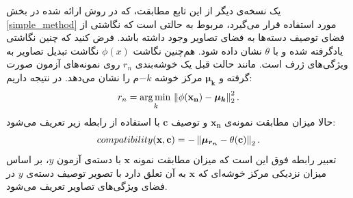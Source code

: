  یک نسخه‌ی دیگر از این تابع مطابقت، که در روش ارائه شده در بخش \ref{simple_method} مورد استفاده قرار می‌گیرد، مربوط به حالتی است که نگاشتی از فضای توصیف دسته‌ها به فضای تصاویر وجود داشته باشد. فرض کنید که چنین نگاشتی یادگرفته شده و با $\theta$ نشان داده شود. هم‌چنین نگاشت
 $\phi(x)$
  نگاشت تبدیل تصاویر به ویژگی‌های ژرف است. مانند حالت قبل یک خوشه‌بندی $r_n$ روی نمونه‌های آزمون صورت گرفته و
   $\boldsymbol{\mu_k} $
    مرکز خوشه $-k$م را نشان می‌دهد. در نتیجه داریم:
 \begin{equation}
 r_n = \operatorname*{arg\,min\,}_{k} \left \lVert \phi(\mathbf{x_n}) - \boldsymbol{\mu_k} \right \rVert_2^2.
 \end{equation}
 حالا میزان مطابقت نمونه‌ی $\mathbf{x_n} $ و توصیف $\mathbf{c} $ با استفاده از رابطه زیر تعریف می‌شود:
 \begin{equation}
 compatibility(\mathbf{x,c}) = - \left \lVert \boldsymbol{\mu_{r_n}} -  \theta(\mathbf{c}) \right \rVert_2.
 \end{equation}
 تعبیر رابطه فوق این است که میزان مطابقت نمونه $\mathbf{x} $ با دسته‌ی آزمون $y$، بر اساس میزان نزدیکی مرکز خوشه‌ای که $\mathbf{x} $ به آن تعلق دارد با تصویر توصیف دسته‌ی $y$ در فضای ویژگی‌های تصاویر تعریف می‌شود.



